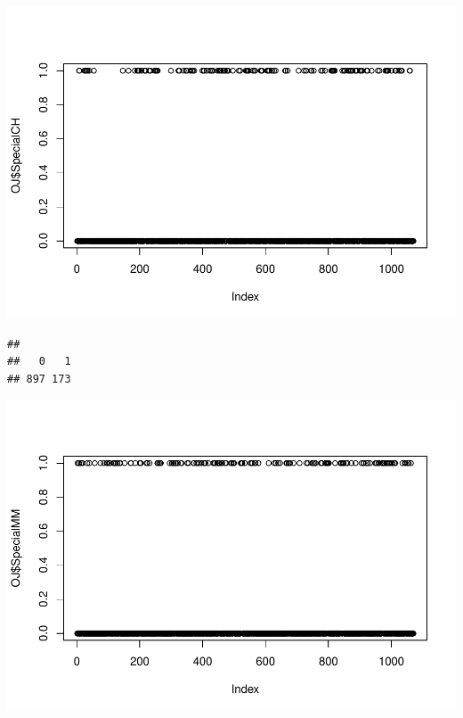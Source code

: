 \documentclass[]{article}
\newenvironment{Shaded}{\begin{snugshade}}{\end{snugshade}}
\newcommand{\KeywordTok}[1]{\textcolor[rgb]{0.13,0.29,0.53}{\textbf{#1}}}
\newcommand{\NormalTok}[1]{#1}
\newcommand{\OperatorTok}[1]{\textcolor[rgb]{0.81,0.36,0.00}{\textbf{#1}}}
\begin{document}
\includegraphics{durand_eltarr_files/figure-latex/unnamed-chunk-3-1.pdf}

\begin{Shaded}
\end{Shaded}

\begin{verbatim}
## 
##   0   1 
## 897 173
\end{verbatim}

\begin{Shaded}
\end{Shaded}

\includegraphics{durand_eltarr_files/figure-latex/unnamed-chunk-4-1.pdf}
\end{document}
